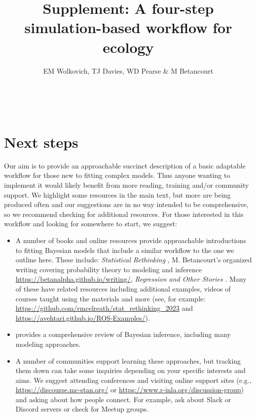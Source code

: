 \documentclass[11pt]{article}
\begin{document}


\renewcommand{\refname}{\CHead{}}


\title{Supplement: A four-step simulation-based workflow for ecology}
\author{EM Wolkovich, TJ Davies, WD Pearse \& M Betancourt}
\maketitle
\

\renewcommand{\thetable}{S\arabic{table}}
\renewcommand{\thefigure}{S\arabic{figure}}

\section*{Next steps}
Our aim is to provide an approachable succinct description of a basic adaptable workflow for those new to fitting complex models. Thus anyone wanting to implement it would likely benefit from more reading, training and/or community support. We highlight some resources in the main text, but more are being produced often and our suggestions are in no way intended to be comprehensive, so we recommend checking for additional resources. For those interested in this workflow and looking for somewhere to start, we suggest:
\begin{itemize}
\item A number of books and online resources provide approachable introductions to fitting Bayesian models that include a similar workflow to the one we outline here. These include: \emph{Statistical Rethinking} \citep{statrethink}, M. Betancourt's organized writing covering probability theory to modeling and inference \url{https://betanalpha.github.io/writing/}, \emph{Regression and Other Stories} \citep{regotherstories}. Many of these have related resources including additional examples, videos of courses taught using the materials and more (see, for example: \url{https://github.com/rmcelreath/stat_rethinking_2023} and \\ \url{https://avehtari.github.io/ROS-Examples/}). 
\item \citet{BDA} provides a comprehensive review of Bayesian inference, including many modeling approaches. 
\item A number of communities support learning these approaches, but tracking them down can take some inquiries depending on your specific interests and aims. We suggest attending conferences and visiting online support sites (e.g., \url{https://discourse.mc-stan.org/} or \url{https://www.r-inla.org/discussion-group}) and asking about how people connect. For example, ask about Slack or Discord servers or check for Meetup groups. 
\end{itemize}
\end{document}
